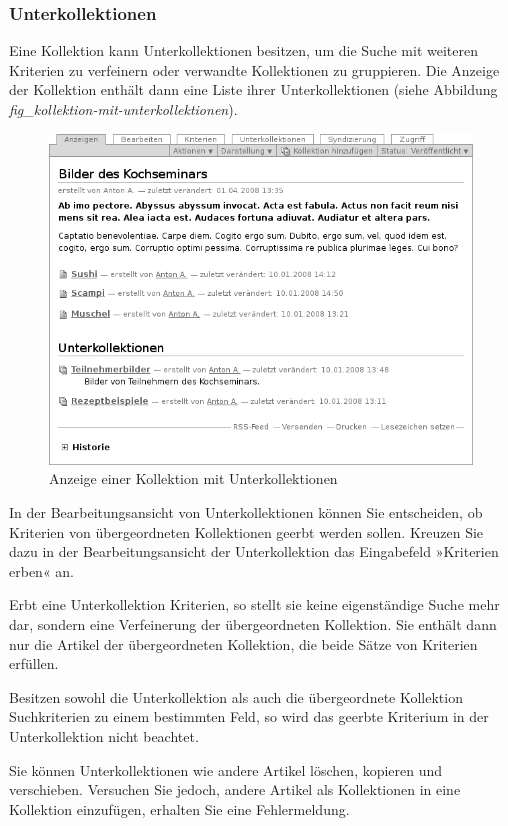 \documentclass[a4paper,12pt,ngerman]{manual}
\begin{document}
\subsubsection{Unterkollektionen}

Eine Kollektion kann Unterkollektionen besitzen, um die Suche mit weiteren
Kriterien zu verfeinern oder verwandte Kollektionen zu gruppieren. Die Anzeige
der Kollektion enthält dann eine Liste ihrer Unterkollektionen (siehe
Abbildung \emph{fig\_kollektion-mit-unterkollektionen}).
\begin{figure}[htbp]
\centering

\includegraphics{kollektion-mit-unterkollektionen.png}
\caption{Anzeige einer Kollektion mit Unterkollektionen}\end{figure}

In der Bearbeitungsansicht von Unterkollektionen können Sie entscheiden, ob
Kriterien von übergeordneten Kollektionen geerbt werden sollen. Kreuzen Sie
dazu in der Bearbeitungsansicht der Unterkollektion das Eingabefeld
»Kriterien erben« an.

Erbt eine Unterkollektion Kriterien, so stellt sie keine eigenständige Suche
mehr dar, sondern eine Verfeinerung der übergeordneten Kollektion. Sie enthält
dann nur die Artikel der übergeordneten Kollektion, die beide Sätze von
Kriterien erfüllen.

Besitzen sowohl die Unterkollektion als auch die übergeordnete Kollektion
Suchkriterien zu einem bestimmten Feld, so wird das geerbte Kriterium in der
Unterkollektion nicht beachtet.

Sie können Unterkollektionen wie andere Artikel löschen, kopieren und
verschieben. Versuchen Sie jedoch, andere Artikel als Kollektionen in eine
Kollektion einzufügen, erhalten Sie eine Fehlermeldung.
\end{document}
